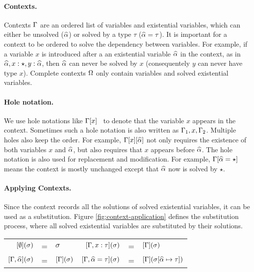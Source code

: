 \paragraph{Contexts.}
Contexts $\Gamma$ are an ordered list of variables and
existential variables, which
can either be unsolved
($\widehat{\alpha}$) or solved by a type $\tau$ ($\widehat{\alpha} = \tau$).
It is important for a context to be ordered to solve the dependency between
variables. For example, if a variable $x$ is introduced after a
an existential variable $\widehat{\alpha}$
in the context, as in
$\widehat{\alpha}, x:\star, y :\widehat{\alpha}$,
then $\widehat{\alpha}$ can never be solved by $x$ (consequentely $y$ can never have type $x$).
Complete contexts $\Omega$ only contain variables and solved existential variables.

\paragraph{Hole notation.}
We use hole notations like $\Gamma[x]$~\cite{} to
denote that the variable $x$ appears in the context. Sometimes such a
hole notation is also written as $\Gamma_1, x, \Gamma_2$.
Multiple holes also keep the order. For example, $\Gamma[x][\widehat{\alpha}]$ not only
requires the existence of both variables $x$ and $\widehat{\alpha}$, but also requires that
$x$ appears before $\widehat{\alpha}$.
The hole notation is also used for replacement and modification. For example,
$\Gamma[\widehat{\alpha} = \star]$ means the context is mostly unchanged except
that $\widehat{\alpha}$ now is solved by $\star$.

\paragraph{Applying Contexts.} Since the context records all the solutions of
solved existential variables, it can be used as a substitution. Figure
\ref{fig:context-application} defines the substitution process, where all solved
existential variables are substituted by their solutions.

\begin{figure*}[t]
  \centering
  \begin{tabular}{rlp{2cm}rll}
    $[\emptyset](\sigma)$ & = & $\sigma$ &
    $[\Gamma, x: \tau](\sigma)$ & = & $[\Gamma](\sigma)$ \\
    $[\Gamma, \widehat{\alpha}](\sigma)$ & = & $[\Gamma](\sigma)$ &
    $[\Gamma, \widehat{\alpha} = \tau](\sigma)$ & = & $[\Gamma](\sigma [\widehat{\alpha} \mapsto \tau])$\\
  \end{tabular}
    \caption{Context application.}
    \label{fig:context-application}
\end{figure*}

